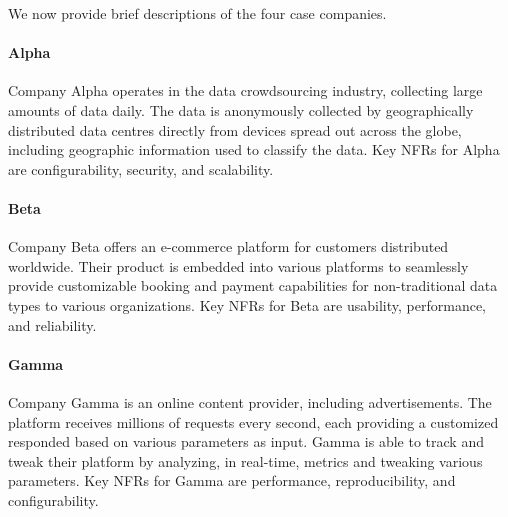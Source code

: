\documentclass[smallextended]{svjour3}
\begin{document}
We now provide brief descriptions of the four case companies.

\paragraph{Alpha}
Company Alpha operates in the data crowdsourcing industry, collecting large amounts of data daily. The data is anonymously collected by geographically distributed data centres directly from devices spread out across the globe, including geographic information used to classify the data. Key NFRs for Alpha are configurability, security, and scalability. 

\paragraph{Beta}
Company Beta offers an e-commerce platform for customers distributed worldwide. Their product is embedded into various platforms to seamlessly provide customizable booking and payment capabilities for non-traditional data types to various organizations. Key NFRs for Beta are usability, performance, and reliability.



\paragraph{Gamma}
Company Gamma is an online content provider, including advertisements. The platform receives millions of requests every second, each providing a customized responded based on various parameters as input. Gamma is able to track and tweak their platform by analyzing, in real-time, metrics and tweaking various parameters. Key NFRs for Gamma are performance, reproducibility, and configurability. 
\end{document}
